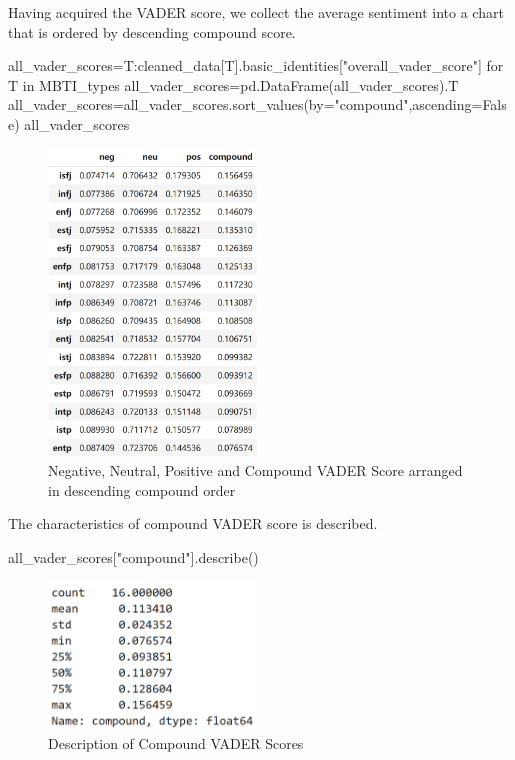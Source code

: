 \documentclass[12pt]{article}
\begin{document}
	Having acquired the VADER score, we collect the average sentiment into a chart that is ordered by descending compound score.
	\begin{python}
all_vader_scores={T:cleaned_data[T].basic_identities["overall_vader_score"] for T in MBTI_types}
all_vader_scores=pd.DataFrame(all_vader_scores).T
all_vader_scores=all_vader_scores.sort_values(by="compound",ascending=False)
all_vader_scores
	\end{python}
	\begin{figure}[H]
			\centering
			\includegraphics[width=0.5\textwidth]{Q2VADERSCORE} 
			\caption{\centering Negative, Neutral, Positive and Compound VADER Score arranged in descending compound order}		
	\end{figure}
	The characteristics of compound VADER score is described.
	\begin{python}
all_vader_scores["compound"].describe()
	\end{python}
	\begin{figure}[H]
			\centering
			\includegraphics[width=0.5\textwidth]{Q2CV} 
			\caption{\centering Description of Compound VADER Scores}		
	\end{figure}
	
\end{document}

